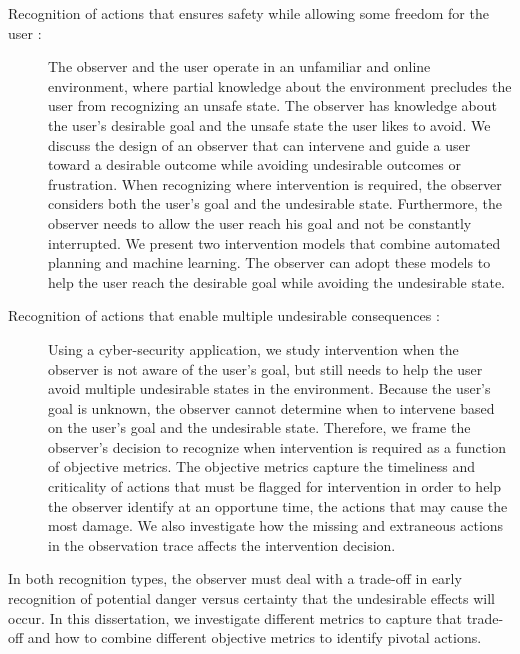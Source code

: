 \begin{description}
\item [Recognition of actions that ensures safety while allowing some freedom for the user : ] The observer and the user operate in an unfamiliar and online environment, where partial knowledge about the environment precludes the user from recognizing an unsafe state. 
The observer has knowledge about the user's desirable goal and the unsafe state the user likes to avoid.
We discuss the design of an observer that can intervene and guide a user toward a desirable outcome while avoiding undesirable outcomes or frustration.
When recognizing where intervention is required, the observer considers both the user's goal and the undesirable state.
Furthermore, the observer needs to allow the user reach his goal and not be constantly interrupted.
We present two intervention models that combine automated planning and machine learning. 
The observer can adopt these models to help the user reach the desirable goal while avoiding the undesirable state.
\item [Recognition of actions that enable multiple undesirable consequences : ] Using a cyber-security application, we study intervention when the observer is not aware of the user's goal, but still needs to help the user avoid multiple undesirable states in the environment. 
Because the user's goal is unknown, the observer cannot determine when to intervene based on the user's goal and the undesirable state. Therefore, we frame the observer's decision to recognize when intervention is required as a function of objective metrics. The objective metrics capture the timeliness and criticality of actions that must be flagged for intervention in order to help the observer identify at an opportune time, the actions that may cause the most damage. 
We also investigate how the missing and extraneous actions in the observation trace affects the intervention decision.
\end{description}
In both recognition types, the observer must deal with a trade-off in early recognition of potential danger versus certainty that the undesirable effects will occur. 
In this dissertation, we investigate different metrics to capture that trade-off and how to combine different objective metrics to identify pivotal actions.

